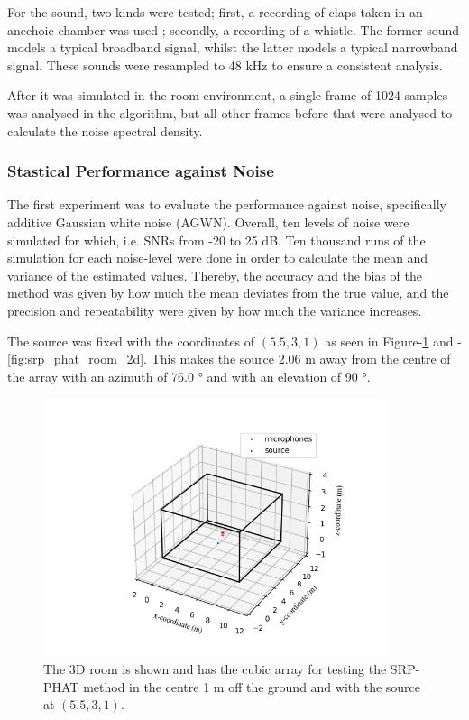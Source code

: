 \documentclass[notitlepage]{report}
\begin{document}
For the sound, two kinds were tested; first, a recording of claps taken in an anechoic chamber was used \cite{noauthor_handclaps_2005}; secondly, a recording of a whistle. The former sound models a typical broadband signal, whilst the latter models a typical narrowband signal. These sounds were resampled to 48 \si{kHz} to ensure a consistent analysis.

After it was simulated in the room-environment, a single frame of 1024 samples was analysed in the algorithm, but all other frames before that were analysed to calculate the noise spectral density.

\subsubsection{Stastical Performance against Noise}

The first experiment was to evaluate the performance against noise, specifically additive Gaussian white noise (AGWN). Overall, ten levels of noise were simulated for which, i.e. SNRs from -20 to 25 \si{dB}. Ten thousand runs of the simulation for each noise-level were done in order to calculate the mean and variance of the estimated values. Thereby, the accuracy and the bias of the method was given by how much the mean deviates from the true value, and the precision and repeatability were given by how much the variance increases.

The source was fixed with the coordinates of $(5.5,3,1)$  as seen in Figure-\ref{fig:srp_phat_room_3d} and -\ref{fig:srp_phat_room_2d}. This makes the source 2.06 \si{m} away from the centre of the array with an azimuth of 76.0 \si{\degree} and with an elevation of 90 \si{\degree}.

\begin{figure}[H]
\includegraphics[width=0.9\textwidth]{../Python/srp_phat/room_3d.png}
\centering
\caption{The 3D room is shown and has the cubic array for testing the SRP-PHAT method in the centre 1 \si{m} off the ground and with the source at $(5.5,3,1)$.}
\label{fig:srp_phat_room_3d}
\centering
\end{figure}
\end{document}
